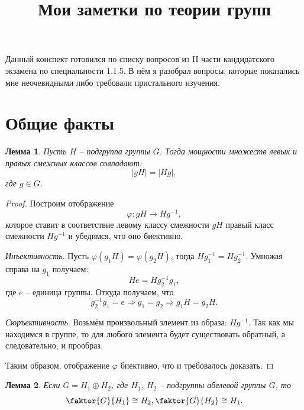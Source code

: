 \documentclass{article}
\title{Мои заметки по теории групп}
\author{}
\date{}
\newtheorem{lemma}{Лемма}[section]
\begin{document}
\maketitle

Данный конспект готовился по списку вопросов из II части кандидатского экзамена по специальности 1.1.5. В нём я разобрал вопросы, которые показались мне неочевидными либо требовали пристального изучения.

\section{Общие факты}

\begin{lemma}
    Пусть $H$ -- подгруппа группы $G$. Тогда мощности множеств левых и правых смежных классов совпадают: $$ |gH| = |Hg|, $$ где $g \in G$.
\end{lemma}
\begin{proof}
    Построим отображение $$ \varphi: gH \rightarrow Hg^{-1}, $$ которое ставит в соответствие левому классу смежности $gH$ правый класс смежности $Hg^{-1}$ и убедимся, что оно биективно.
    
    \textit{Инъективность}. Пусть $\varphi(g_1 H) = \varphi(g_2H)$, тогда $Hg_1^{-1} = Hg_2^{-1}$. Умножая справа на $g_1$ получаем: $$ He = H g_2^{-1} g_1, $$ где $e$ -- единица группы. Откуда получаем, что $$ g_2^{-1} g_1 = e \Rightarrow g_1 = g_2 \Rightarrow g_1 H = g_2 H. $$

    \textit{Сюръективность}. Возьмём произвольный элемент из образа: $Hg^{-1}$. Так как мы находимся в группе, то для любого элемента будет существовать обратный, а следовательно, и прообраз.

    Таким образом, отображение $\varphi$ биективно, что и требовалось доказать.
\end{proof}

\begin{lemma} \label{eto_basa}
    Если  $G = H_1 \oplus H_2$, где $H_1$, $H_2$ -- подгруппы абелевой группы $G$, то $$ \faktor{G}{H_1} \cong H_2, \faktor{G}{H_2} \cong H_1. $$
\end{lemma}
\end{document}
